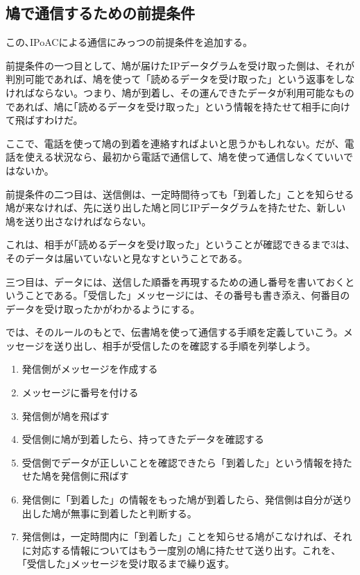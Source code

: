 \subsection{鳩で通信するための前提条件}

この､IPoACによる通信にみっつの前提条件を追加する。

前提条件の一つ目として、鳩が届けたIPデータグラムを受け取った側は、それが判別可能であれば、鳩を使って「読めるデータを受け取った」という返事をしなければならない。つまり、鳩が到着し、その運んできたデータが利用可能なものであれば、鳩に｢読めるデータを受け取った」という情報を持たせて相手に向けて飛ばすわけだ。

ここで、電話を使って鳩の到着を連絡すればよいと思うかもしれない。だが、電話を使える状況なら、最初から電話で通信して、鳩を使って通信しなくていいではないか。

前提条件の二つ目は、送信側は、一定時間待っても「到着した」ことを知らせる鳩が来なければ、先に送り出した鳩と同じIPデータグラムを持たせた、新しい鳩を送り出さなければならない。

これは、相手が｢読めるデータを受け取った」ということが確認できるまで3は、そのデータは届いていないと見なすということである。

三つ目は、データには、送信した順番を再現するための通し番号を書いておくということである。「受信した」メッセージには、その番号も書き添え、何番目のデータを受け取ったかがわかるようにする。

では、そのルールのもとで、伝書鳩を使って通信する手順を定義していこう。メッセージを送り出し、相手が受信したのを確認する手順を列挙しよう。

	\begin{enumerate}
		\item 発信側がメッセージを作成する
		\item メッセージに番号を付ける
		\item 発信側が鳩を飛ばす
		\item 受信側に鳩が到着したら、持ってきたデータを確認する
		\item 受信側でデータが正しいことを確認できたら「到着した」という情報を持たせた鳩を発信側に飛ばす
		\item 発信側に「到着した」の情報をもった鳩が到着したら、発信側は自分が送り出した鳩が無事に到着したと判断する。
		\item 発信側は，一定時間内に「到着した」ことを知らせる鳩がこなければ、それに対応する情報についてはもう一度別の鳩に持たせて送り出す。これを、｢受信した｣メッセージを受け取るまで繰り返す。
	\end{enumerate}

